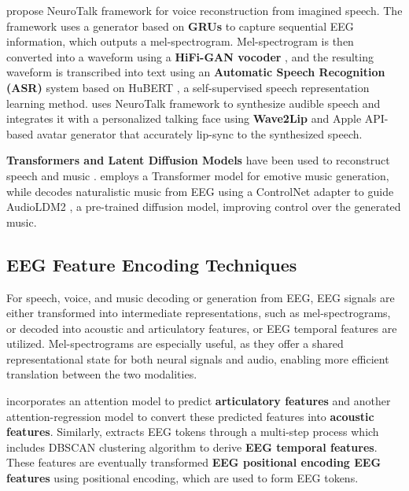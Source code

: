 \citet{lee2023towards} propose NeuroTalk framework for voice reconstruction from imagined speech. The framework uses a generator based on \textbf{GRUs} to capture sequential EEG information, which outputs a mel-spectrogram. Mel-spectrogram is then converted into a waveform using a \textbf{HiFi-GAN vocoder} \cite{kong2020hifi}, and the resulting waveform is transcribed into text using an \textbf{Automatic Speech Recognition (ASR)} system based on HuBERT \cite{hsu2021hubert}, a self-supervised speech representation learning method. \citet{park2024towards} uses NeuroTalk framework to synthesize audible speech and integrates it with a personalized talking face using \textbf{Wave2Lip} \cite{prajwal2020lip} and Apple API-based avatar generator that accurately lip-sync to the synthesized speech.


\textbf{Transformers and Latent Diffusion Models} have been used to reconstruct speech \cite{mizuno2024investigation} and music \cite{postolache2024naturalistic, jiang2024eeg}. \citet{jiang2024eeg} employs a Transformer model for emotive music generation, while \citet{postolache2024naturalistic} decodes naturalistic music from EEG using a ControlNet adapter \cite{zhang2023adding} to guide AudioLDM2 \cite{liu2024audioldm}, a pre-trained diffusion model, improving control over the generated music.


\subsection{EEG Feature Encoding Techniques}

For speech, voice, and music decoding or generation from EEG, EEG signals are either transformed into intermediate representations, such as mel-spectrograms, or decoded into acoustic and articulatory features\cite{krishna2021advancing}, or EEG temporal features \cite{jiang2024eeg} are utilized. Mel-spectrograms are especially useful, as they offer a shared representational state for both neural signals and audio, enabling more efficient translation between the two modalities.

\citet{krishna2021advancing} incorporates an attention model to predict \textbf{articulatory features} and another attention-regression model to convert these predicted features into \textbf{acoustic features}. Similarly, \citet{jiang2024eeg} extracts EEG tokens through a multi-step process which includes DBSCAN clustering algorithm to derive \textbf{EEG temporal features}. These features are eventually transformed \textbf{EEG positional encoding EEG features} using positional encoding, which are used to form EEG tokens.

